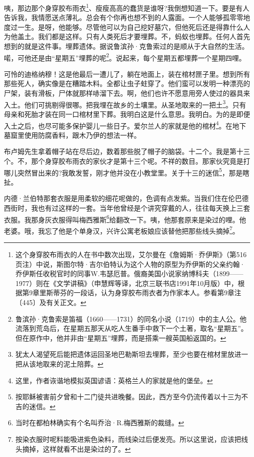 \par 咦，那边那个身穿胶布雨衣\footnote{这个身穿胶布雨衣的人在书中数次出现，艾尔曼在《詹姆斯·乔伊斯》（第516页注）中说，斯图尔特·吉尔伯特认为这个人物的原型为乔伊斯的父亲约翰·乔伊斯任收税官时的同事W.韦瑟厄普。俄裔美国小说家纳博科夫（1899——1977）则在《文学讲稿》（申慧辉等译，北京三联书店1991年10月版）中，根据第9章里斯蒂芬的一段话，认为身穿胶布雨衣者为作家本人。参看第9章注〔445〕及有关正文。}、瘦瘦高高的蠢货是谁呀?我倒想知道一下。要是有人告诉我，我情愿送点薄礼。总会有个你再也想不到的人露面。一个人能够孤零零地度过一生。是呀，他能够。尽管他可以为自己挖好墓穴，但他死后还是得靠什么人为他盖土。我们都是这样。只有人类死后才要埋葬。不，蚂蚁也埋葬。任何人首先想到的就是这件事。埋葬遗体。据说鲁滨孙·克鲁索过的是顺从于大自然的生活。喏，可他还是由“星期五”埋葬的呢\footnote{鲁滨孙·克鲁索是笛福（1660——1731）的同名小说（1719）中的主人公。他流落到荒岛后，在星期五那天从吃人生番手中救下一个土著，取名“星期五”。但在原作中，他并非由“星期五”埋葬，而是搭乘一艘英国船返国的。}。说起来，每个星期五都埋葬一个星期四哩。
\par 可怜的迪格纳穆！这是他最后一遭儿了，躺在地面上，装在棺材匣子里。想到所有那些死人，确实像是在糟踏木料。全都让虫子蛀穿了。他们蛮可以发明一种漂亮的尸架，装有滑板，尸体就那样哧溜下去。啊，他们也许不愿意用旁人使过的器具来入土。他们可挑剔得很哪。把我埋在故乡的土壤里。从圣地取来的一把土\footnote{犹太人渴望死后能把遗体运回圣地巴勒斯坦去埋葬，至少也要在棺材里放进一把从该地取来的泥土陪葬。}。只有母亲和死胎才装在同一口棺材里下葬。我明白这是什么意思。我明白。为的是即便入土之后，也尽可能多保护婴儿一些日子。爱尔兰人的家就是他的棺材\footnote{这里，作者诙谐地模拟英国谚语：英格兰人的家就是他的堡垒。}。在地下墓窟里使用防腐香料，跟木乃伊的想法一样。
\par 布卢姆先生拿着帽子站在尽后边，数着那些脱了帽子的脑袋。十二个。我是第十三个。不，那个身穿胶布雨衣的家伙才是第十三个呢。不祥的数目。那家伙究竟是打哪儿突然冒出来的?我敢发誓，刚才他并没在小教堂里。关于十三的迷信\footnote{按耶稣被害前夕曾和十二门徒共进晚餐。因此，西方至今仍流传着以十三为不吉的迷信。}，那是瞎扯。
\par 内德·兰伯特那套衣服是用柔软的细花呢做的，色调有点发紫。当我们住在伦巴德西街时，我也有过这样的一套。当年他曾经是个讲究穿戴的人，往往每天换上三套衣服。我那身灰衣服得叫梅西雅斯\footnote{当时在都柏林确实有个名叫乔治·R.梅西雅斯的裁缝。}给翻改一下。咦，他那套原来是染过的哩。他老婆。哦，我忘了他是个单身汉，兴许公寓老板娘应该替他把那些线头摘掉\footnote{按染衣服时呢料能吸进紫色染料，而线染过后便发亮。所以这里说，应该把线头摘掉，这样就看不出是染过的了。}。
